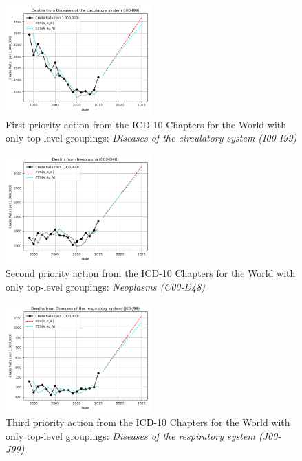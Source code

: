 \documentclass[10pt, a4paper, twocolumn]{IEEEconf}
\begin{document}
\begin{figure}[H]
  \centering
  \includegraphics[width=0.5\textwidth]{results/WORLD_ICD10_CHAPTER_ROOTS/Diseases_of_the_circulatory_system_I00-I99_ets.png}
  \caption{First priority action from the ICD-10 Chapters for the World with only top-level groupings: \textit{Diseases of the circulatory system (I00-I99)}}\label{fig:k10a}
\end{figure}

\begin{figure}[H]
  \centering
  \includegraphics[width=0.5\textwidth]{results/WORLD_ICD10_CHAPTER_ROOTS/Neoplasms_C00-D48_ets.png}
  \caption{Second priority action from the ICD-10 Chapters for the World with only top-level groupings: \textit{Neoplasms (C00-D48)}}\label{fig:k10b}
\end{figure}

\begin{figure}[H]
  \centering
  \includegraphics[width=0.5\textwidth]{results/WORLD_ICD10_CHAPTER_ROOTS/Diseases_of_the_respiratory_system_J00-J99_ets.png}
  \caption{Third priority action from the ICD-10 Chapters for the World with only top-level groupings: \textit{Diseases of the respiratory system (J00-J99)}}\label{fig:k10c}
\end{figure}
\end{document}
